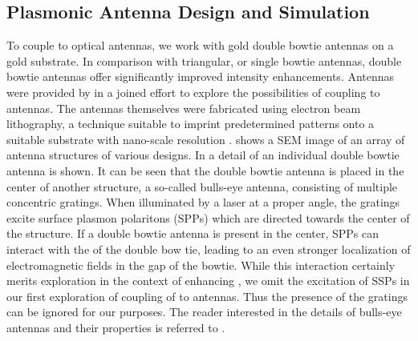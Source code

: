 	\subsection{Plasmonic Antenna Design and Simulation} \label{sec::structure_antenna}

		 To couple \sivs to optical antennas, we work with gold double bowtie antennas on a gold substrate. In comparison with triangular, or single bowtie antennas, double bowtie antennas offer significantly improved intensity enhancements. Antennas were provided by \nancy in a joined effort to explore the possibilities of coupling \sivs to antennas. The antennas themselves were fabricated using electron beam lithography, a technique suitable to imprint predetermined patterns onto a suitable substrate with nano-scale resolution \cite{pease1981electron}.  shows a SEM image of an array of antenna structures of various designs. In  a detail of an individual double bowtie antenna is shown. It can be seen that the double bowtie antenna is placed in the center of another structure, a so-called bulls-eye antenna, consisting of multiple concentric gratings. When illuminated by a laser at a proper angle, the gratings excite surface plasmon polaritons (SPPs) which are directed towards the center of the structure. If a double bowtie antenna is present in the center, SPPs can interact with the \LSPs of the double bow tie, leading to an even stronger localization of electromagnetic fields in the gap of the bowtie. While this interaction certainly merits exploration in the context of enhancing \sivs, we omit the excitation of SSPs in our first exploration of coupling of \sivs to antennas. Thus the presence of the gratings can be ignored for our purposes. The reader interested in the details of bulls-eye antennas and their properties is referred to \cite{rahbany2016towards}.

